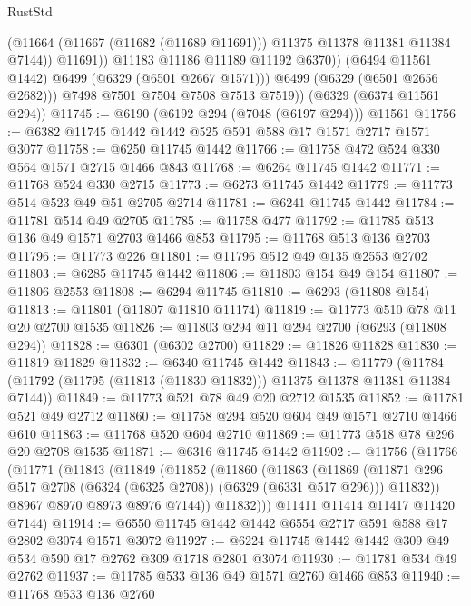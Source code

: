 \begin{lexlean}{RustStd}
\begin{coremodule}
{\begin{coremodule}
{{{{{{{{{{{{{{{{{{{{{{{{{{{{{{{{{{{                      (@11664 (@11667 (@11682 (@11689 @11691))) @11375 @11378 @11381 @11384 @7144))
                    @11691))
                @11183
                @11186
                @11189
                @11192
                @6370))
            (@6494 @11561 @1442)
            @6499
            (@6329 (@6501 @2667 @1571)))
          @6499
          (@6329 (@6501 @2656 @2682)))
        @7498
        @7501
        @7504
        @7508
        @7513
        @7519))
    (@6329 (@6374 @11561 @294))
@11745 := @6190 (@6192 @294 (@7048 (@6197 @294))) @11561
@11756 := @6382 @11745 @1442 @1442 @525 @591 @588 @17 @1571 @2717 @1571 @3077
@11758 := @6250 @11745 @1442
@11766 := @11758 @472 @524 @330 @564 @1571 @2715 @1466 @843
@11768 := @6264 @11745 @1442
@11771 := @11768 @524 @330 @2715
@11773 := @6273 @11745 @1442
@11779 := @11773 @514 @523 @49 @51 @2705 @2714
@11781 := @6241 @11745 @1442
@11784 := @11781 @514 @49 @2705
@11785 := @11758 @477
@11792 := @11785 @513 @136 @49 @1571 @2703 @1466 @853
@11795 := @11768 @513 @136 @2703
@11796 := @11773 @226
@11801 := @11796 @512 @49 @135 @2553 @2702
@11803 := @6285 @11745 @1442
@11806 := @11803 @154 @49 @154
@11807 := @11806 @2553
@11808 := @6294 @11745
@11810 := @6293 (@11808 @154)
@11813 := @11801 (@11807 @11810 @11174)
@11819 := @11773 @510 @78 @11 @20 @2700 @1535
@11826 := @11803 @294 @11 @294 @2700 (@6293 (@11808 @294))
@11828 := @6301 (@6302 @2700)
@11829 := @11826 @11828
@11830 := @11819 @11829
@11832 := @6340 @11745 @1442
@11843 := @11779
    (@11784 (@11792 (@11795 (@11813 (@11830 @11832))) @11375 @11378 @11381 @11384 @7144))
@11849 := @11773 @521 @78 @49 @20 @2712 @1535
@11852 := @11781 @521 @49 @2712
@11860 := @11758 @294 @520 @604 @49 @1571 @2710 @1466 @610
@11863 := @11768 @520 @604 @2710
@11869 := @11773 @518 @78 @296 @20 @2708 @1535
@11871 := @6316 @11745 @1442
@11902 := @11756
    (@11766
      (@11771
        (@11843
          (@11849
            (@11852
              (@11860
                (@11863
                  (@11869
                    (@11871 @296 @517 @2708 (@6324 (@6325 @2708)) (@6329 (@6331 @517 @296)))
                    @11832))
                @8967
                @8970
                @8973
                @8976
                @7144))
            @11832)))
      @11411
      @11414
      @11417
      @11420
      @7144)
@11914 := @6550 @11745 @1442 @1442 @6554 @2717 @591 @588 @17 @2802 @3074 @1571 @3072
@11927 := @6224 @11745 @1442 @1442 @309 @49 @534 @590 @17 @2762 @309 @1718 @2801 @3074
@11930 := @11781 @534 @49 @2762
@11937 := @11785 @533 @136 @49 @1571 @2760 @1466 @853
@11940 := @11768 @533 @136 @2760
}}}}}}}}}}}}}}}}}}}}}}}}}}}}}}}}}}}
\end{coremodule}}
\end{coremodule}
\end{lexlean}
